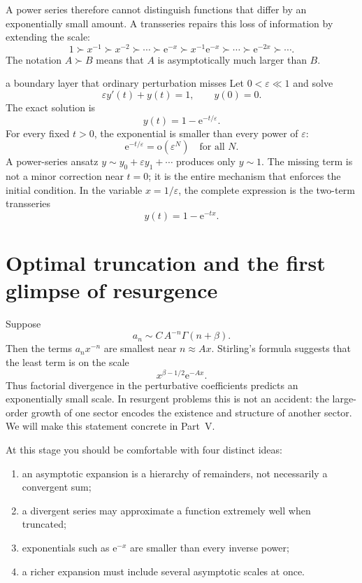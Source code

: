 \documentclass[11pt,openany]{book}
\theoremstyle{plain}
\theoremstyle{definition}
\theoremstyle{remark}
\newcommand{\smallo}{\mathrm{o}}
\newcommand{\e}{\mathrm{e}}
\begin{document}
A power series therefore cannot distinguish functions that differ by an exponentially small amount. A transseries repairs this loss of information by extending the scale:
\[
  1\succ x^{-1}\succ x^{-2}\succ\cdots
  \succ \e^{-x}\succ x^{-1}\e^{-x}\succ\cdots
  \succ \e^{-2x}\succ\cdots.
\]
The notation $A\succ B$ means that $A$ is asymptotically much larger than $B$.

\begin{workedbox}{a boundary layer that ordinary perturbation misses}
Let $0<\varepsilon\ll1$ and solve
\[
  \varepsilon y'(t)+y(t)=1,\qquad y(0)=0.
\]
The exact solution is
\[
  y(t)=1-\e^{-t/\varepsilon}.
\]
For every fixed $t>0$, the exponential is smaller than every power of $\varepsilon$:
\[
  \e^{-t/\varepsilon}=\smallo(\varepsilon^N)
  \quad\text{for all }N.
\]
A power-series ansatz $y\sim y_0+\varepsilon y_1+\cdots$ produces only $y\sim1$. The missing term is not a minor correction near $t=0$; it is the entire mechanism that enforces the initial condition. In the variable $x=1/\varepsilon$, the complete expression is the two-term transseries
\[
  y(t)=1-\e^{-tx}.
\]
\end{workedbox}

\section{Optimal truncation and the first glimpse of resurgence}
Suppose
\[
  a_n\sim C\,A^{-n}\Gamma(n+\beta).
\]
Then the terms $a_n x^{-n}$ are smallest near $n\approx A x$. Stirling's formula suggests that the least term is on the scale
\[
  x^{\beta-1/2}\e^{-Ax}.
\]
Thus factorial divergence in the perturbative coefficients predicts an exponentially small scale. In resurgent problems this is not an accident: the large-order growth of one sector encodes the existence and structure of another sector. We will make this statement concrete in Part~V.

\begin{checkpointbox}
At this stage you should be comfortable with four distinct ideas:
\begin{enumerate}
\item an asymptotic expansion is a hierarchy of remainders, not necessarily a convergent sum;
\item a divergent series may approximate a function extremely well when truncated;
\item exponentials such as $\e^{-x}$ are smaller than every inverse power;
\item a richer expansion must include several asymptotic scales at once.
\end{enumerate}
\end{checkpointbox}
\end{document}
